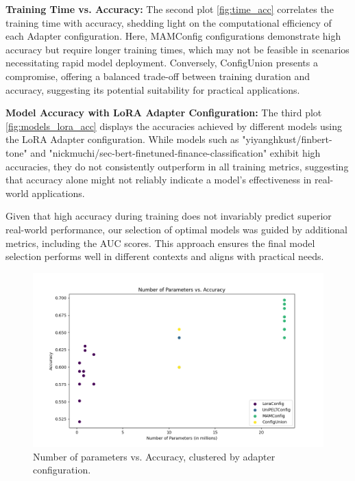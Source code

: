 \documentclass[conference]{IEEEtran}
\begin{document}
\textbf{Training Time vs. Accuracy:} The second plot \ref{fig:time_acc} correlates the training time with accuracy, shedding light on the computational efficiency of each Adapter configuration. Here, MAMConfig configurations demonstrate high accuracy but require longer training times, which may not be feasible in scenarios necessitating rapid model deployment. Conversely, ConfigUnion presents a compromise, offering a balanced trade-off between training duration and accuracy, suggesting its potential suitability for practical applications.

\textbf{Model Accuracy with LoRA Adapter Configuration:} The third plot \ref{fig:models_lora_acc} displays the accuracies achieved by different models using the LoRA Adapter configuration. While models such as "yiyanghkust/finbert-tone" and "nickmuchi/sec-bert-finetuned-finance-classification" exhibit high accuracies, they do not consistently outperform in all training metrics, suggesting that accuracy alone might not reliably indicate a model's effectiveness in real-world applications.

Given that high accuracy during training does not invariably predict superior real-world performance, our selection of optimal models was guided by additional metrics, including the AUC scores. This approach ensures the final model selection performs well in different contexts and aligns with practical needs.

\begin{figure}[!h]
    \centering
    \includegraphics[width=.85\linewidth]{pictures/number_params_vs_accuracy.png}
    \caption{Number of parameters vs. Accuracy, clustered by adapter configuration.}
    \label{fig:param_acc}
\end{figure}
\end{document}
